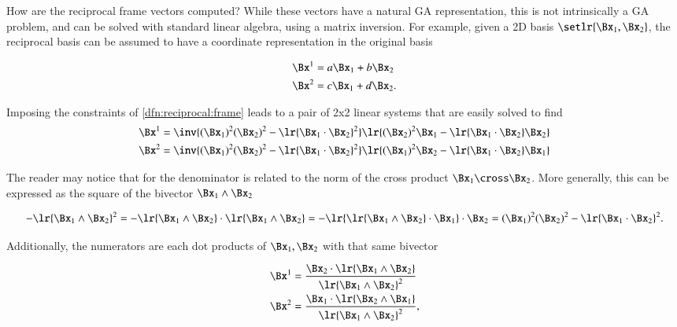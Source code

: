%
%
How are the reciprocal frame vectors computed?  While these vectors have a natural GA representation, this is not intrinsically a GA problem, and can be solved with standard linear algebra, using a matrix inversion.
For example, given a 2D basis \( \setlr{ \Bx_1, \Bx_2 } \), the reciprocal basis can be assumed to have a coordinate representation in the original basis

\begin{dmath}\label{eqn:reciprocal_R2:100}
\begin{aligned}
\Bx^1 &= a \Bx_1 + b \Bx_2 \\
\Bx^2 &= c \Bx_1 + d \Bx_2.
\end{aligned}
\end{dmath}

Imposing the constraints of \cref{dfn:reciprocal:frame} leads to a pair of 2x2 linear systems that are easily solved to find
\begin{dmath}\label{eqn:reciprocal_R2:120}
\begin{aligned}
\Bx^1 &= \inv{ (\Bx_1)^2 (\Bx_2)^2 - \lr{ \Bx_1 \cdot \Bx_2}^2 } \lr{ (\Bx_2)^2 \Bx_1 - \lr{ \Bx_1 \cdot \Bx_2 } \Bx_2 } \\
\Bx^2 &= \inv{ (\Bx_1)^2 (\Bx_2)^2 - \lr{ \Bx_1 \cdot \Bx_2}^2 } \lr{ (\Bx_1)^2 \Bx_2 - \lr{ \Bx_1 \cdot \Bx_2 } \Bx_1 } \\
\end{aligned}
\end{dmath}

The reader may notice that for  the denominator is related to the norm of the cross product \( \Bx_1 \cross \Bx_2 \).
More generally, this can be expressed as the square of the bivector \( \Bx_1 \wedge \Bx_2 \)

\begin{dmath}\label{eqn:reciprocal_R2:140}
-\lr{\Bx_1 \wedge \Bx_2 }^2
=
-\lr{\Bx_1 \wedge \Bx_2 } \cdot \lr{\Bx_1 \wedge \Bx_2 }
=
-\lr{ \lr{\Bx_1 \wedge \Bx_2 } \cdot \Bx_1 } \cdot \Bx_2
=
(\Bx_1)^2 (\Bx_2)^2 - \lr{\Bx_1 \cdot \Bx_2}^2.
\end{dmath}

Additionally, the numerators are each dot products of \( \Bx_1, \Bx_2 \) with that same bivector

\begin{dmath}\label{eqn:reciprocal_R2:160}
\begin{aligned}
\Bx^1 &= \frac{\Bx_2 \cdot \lr{ \Bx_1 \wedge \Bx_2 } }{ \lr{ \Bx_1 \wedge \Bx_2}^2 } \\
\Bx^2 &= \frac{\Bx_1 \cdot \lr{ \Bx_2 \wedge \Bx_1 } }{ \lr{ \Bx_1 \wedge \Bx_2}^2 },
\end{aligned}
\end{dmath}

